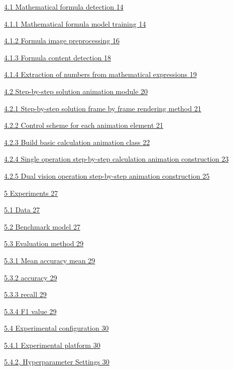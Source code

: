 \documentclass[
]{article}
\begin{document}
\hyperref[mathematical-equation-detection]{4.1 Mathematical formula
detection 14}

\hyperref[mathematical-equation-model-training]{4.1.1 Mathematical
formula model training 14}

\hyperref[formula-image-preprocessing]{4.1.2 Formula image preprocessing
16}

\hyperref[formula-content-detection]{4.1.3 Formula content detection 18}

\hyperref[mathematical-formula-number-extraction]{4.1.4 Extraction of
numbers from mathematical expressions 19}

\hyperref[step-by-step-solution-animation-module]{4.2 Step-by-step
solution animation module 20}

\hyperref[step-by-step-solution-frame-by-frame-rendering-method]{4.2.1
Step-by-step solution frame by frame rendering method 21}

\hyperref[the-control-scheme-for-each-animation-element]{4.2.2 Control
scheme for each animation element 21}

\hyperref[build-basic-formula-animation-class]{4.2.3 Build basic
calculation animation class 22}

\hyperref[monocular-operation-is-divided-into-step-by-step-animation-construction]{4.2.4
Single operation step-by-step calculation animation construction 23}

\hyperref[two-eye-operation-is-divided-into-step-by-step-animation-construction]{4.2.5
Dual vision operation step-by-step animation construction 25}

\hyperref[experiment]{5 Experiments 27}

\hyperref[data]{5.1 Data 27}

\hyperref[benchmark-model]{5.2 Benchmark model 27}

\hyperref[appraisal-procedure]{5.3 Evaluation method 29}

\hyperref[mean-average-accuracy]{5.3.1 Mean accuracy mean 29}

\hyperref[accuracy]{5.3.2 accuracy 29}

\hyperref[recall]{5.3.3 recall 29}

\hyperref[f1-value]{5.3.4 F1 value 29}

\hyperref[experimental-configuration]{5.4 Experimental configuration 30}

\hyperref[experimental-platform]{5.4.1 Experimental platform 30}

\hyperref[hyperparameter-settings]{5.4.2, Hyperparameter Settings 30}
\end{document}
